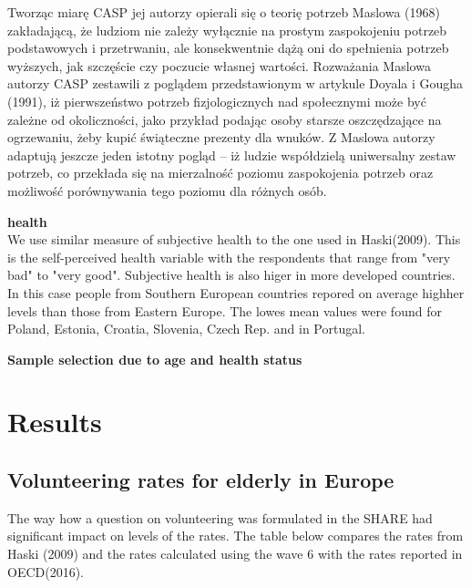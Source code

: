 \documentclass[10pt, letterpaper]{article}
\begin{document}
\begin{spacing}{1.4}
Tworząc miarę CASP jej autorzy opierali się o teorię potrzeb Maslowa (1968) zakładającą, że ludziom nie zależy wyłącznie na prostym zaspokojeniu potrzeb podstawowych i przetrwaniu, ale konsekwentnie dążą oni do spełnienia potrzeb wyższych, jak szczęście czy poczucie własnej wartości. Rozważania Maslowa autorzy CASP zestawili z poglądem przedstawionym w artykule Doyala i Gougha (1991), iż pierwszeństwo potrzeb fizjologicznych nad społecznymi może być zależne od okoliczności, jako przykład podając osoby starsze oszczędzające na ogrzewaniu, żeby kupić świąteczne prezenty dla wnuków. Z Maslowa autorzy adaptują jeszcze jeden istotny pogląd – iż ludzie współdzielą uniwersalny zestaw potrzeb, co przekłada się na mierzalność poziomu zaspokojenia potrzeb oraz możliwość porównywania tego poziomu dla różnych osób. 



\textbf{health} \\
We use similar measure of subjective health to the one used in Haski(2009). This is the self-perceived health variable with the respondents that range from "very bad" to "very good". Subjective health is also higer in more developed countries. In this case people from Southern European countries repored on average highher levels than those from Eastern Europe. The lowes mean values were found for Poland, Estonia, Croatia, Slovenia, Czech Rep. and in Portugal.

\textbf{Sample selection due to age and health status }\\

\section{Results}

\subsection*{Volunteering rates for elderly in Europe}

The way how a question on volunteering was formulated in the SHARE had significant impact on levels of the rates. The table below compares the rates from Haski (2009) and the rates calculated using the wave 6 with the rates reported in OECD(2016).



\end{spacing}
\end{document}
